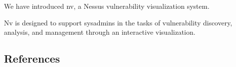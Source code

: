 \documentclass{acm_proc_article-sp}
\begin{document}
We have introduced nv, a Nessus vulnerability visualization system.

Nv is designed to support sysadmins in the tasks of vulnerability discovery, analysis, and management through an interactive visualization.





\subsection{References}
\end{document}
